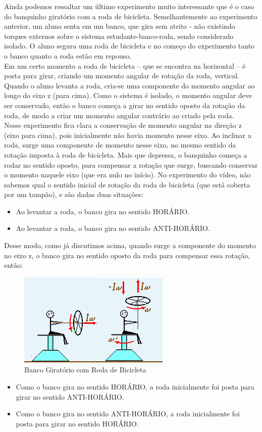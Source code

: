 Ainda podemos ressaltar um último experimento muito interessante que é o caso do banquinho giratório com a roda de bicicleta. Semelhantemente ao experimento anterior, um aluno senta em um banco, que gira sem atrito - não existindo torques externos sobre o sistema estudante-banco-roda, sendo considerado isolado. O aluno segura uma roda de bicicleta e no começo do experimento tanto o banco quanto a roda estão em repouso.\\

Em um certo momento a roda de bicicleta – que se encontra na horizontal – é posta para girar, criando um momento angular de rotação da roda, vertical. Quando o aluno levanta a roda, cria-se uma componente do momento angular ao longo do eixo z (para cima). Como o sistema é isolado, o momento angular deve ser conservado, então o banco começa a girar no sentido oposto da rotação da roda, de modo a criar um momento angular contrário ao criado pela roda.\\

Nesse experimento fica clara a conservação de momento angular na direção z (eixo para cima), pois inicialmente não havia momento nesse eixo. Ao inclinar a roda, surge uma componente de momento nesse eixo, no mesmo sentido da rotação imposta à roda de bicicleta. Mais que depressa, o banquinho começa a rodar no sentido oposto, para compensar a rotação que surge, buscando conservar o momento naquele eixo (que era nulo no início). No experimento do vídeo, não sabemos qual o sentido inicial de rotação da roda de bicicleta (que está coberta por um tampão), e são dadas duas situações:

\begin{itemize}
    \item Ao levantar a roda, o banco gira no sentido HORÁRIO.
    \item Ao levantar a roda, o banco gira no sentido ANTI-HORÁRIO.
\end{itemize}

Desse modo, como já discutimos acima, quando surge a componente do momento no eixo z, o banco gira no sentido oposto da roda para compensar essa rotação, então:


\begin{figure}[H]
  \centering
  \includegraphics[scale=1.9]{images/i6.png}
  \caption{Banco Giratório com Roda de Bicicleta}
\end{figure}

\begin{itemize}
    \item Como o banco gira no sentido HORÁRIO, a roda inicialmente foi posta para girar no sentido ANTI-HORÁRIO.
    \item Como o banco gira no sentido ANTI-HORÁRIO, a roda inicialmente foi posta para girar no sentido HORÁRIO.
\end{itemize}
